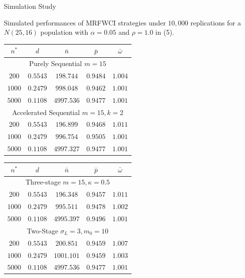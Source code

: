\documentclass [xcolor=svgnames, t] {beamer}
\begin{document}
\begin{frame}{Simulation Study}

Simulated performances of  MRFWCI strategies under $10,000$ replications for a $N(25,16)$ population with $\alpha=0.05$ and $\rho=1.0$ in (5).
 \begin{center}
\begin{tabular}{c c c c c} 
 \hline
 $n^*$ & $d$ & $\bar{n}$ & $\bar{p}$ & $\bar{\omega}$\\
 \hline
 \multicolumn{5}{c}{Purely Sequential $m=15$}\\
  \hline
 $200$ & $0.5543$ & $198.744$ & $0.9484$  & $1.004$\\ 
 $1000$ & $0.2479$ & $998.048$ & $0.9462$ & $1.001$ \\ 
  $5000$ & $0.1108$ & $4997.536$ & $0.9477$ & $1.001$ \\ 
  \hline
 \multicolumn{5}{c}{Accelerated Sequential $m=15,k=2$}\\
 \hline
 $200$ & $0.5543$ & $196.899$ & $0.9468$ & $1.011$ \\ 
 $1000$ & $0.2479$ & $996.754$ & $0.9505$  & $1.001$\\ 
  $5000$ & $0.1108$ & $4997.327$ & $0.9477$  & $1.001$\\ 
 \hline
\end{tabular}
\end{center}
    
\end{frame}
\begin{frame}{}

 \begin{center}
\begin{tabular}{c c c c c} 
 \hline
 $n^*$ & $d$ & $\bar{n}$ & $\bar{p}$ & $\bar{\omega}$\\
 \hline
 \multicolumn{5}{c}{Three-stage $m=15,\kappa=0.5$}\\
  \hline
 $200$ & $0.5543$ & $196.348$ & $0.9457$  & $1.011$\\ 
 $1000$ & $0.2479$ & $995.511$ & $0.9478$ & $1.002$ \\ 
  $5000$ & $0.1108$ & $4995.397$ & $0.9496$ & $1.001$ \\ 
  \hline
\multicolumn{5}{c}{Two-Stage $\sigma_L=3, m_0=10$}\\
 \hline
 $200$ & $0.5543$ & $200.851$ & $0.9459$ & $1.007$ \\ 
 $1000$ & $0.2479$ & $1001.101$ & $0.9459$  & $1.003$\\ 
  $5000$ & $0.1108$ & $4997.536$ & $0.9477$  & $1.001$\\ 
 \hline
\end{tabular}
\end{center}
    
\end{frame}
\end{document}
